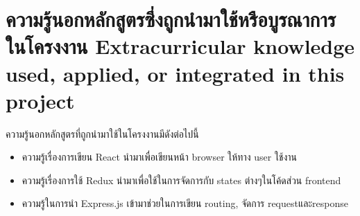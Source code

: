 \section{\ifcpe%
ความรู้นอกหลักสูตรซึ่งถูกนำมาใช้หรือบูรณาการในโครงงาน
\else%
Extracurricular knowledge used, applied, or integrated in this project
\fi
}

ความรู้นอกหลักสูตรที่ถูกนำมาใช้ในโครงงานมีดังต่อไปนี้
\begin{itemize}
  \item ความรู้เรื่องการเขียน React นำมาเพื่อเขียนหน้า browser ให้ทาง user ใช้งาน
  \item ความรู้เรื่องการใช้ Redux นำมาเพื่อใช้ในการจัดการกับ states ต่างๆในโค้ดส่วน frontend
  \item ความรู้ในการนำ Express.js เข้ามาช่วยในการเขียน routing, จัดการ requestและresponse
\end{itemize}
